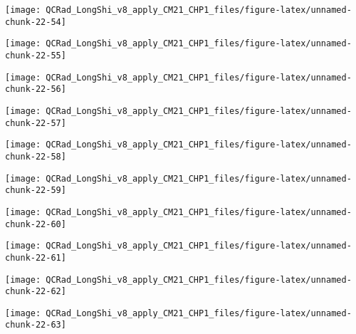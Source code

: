 \documentclass[
  10pt,
  a4paper,oneside]{article}
\begin{document}
\begin{center}\texttt{[image: QCRad\_LongShi\_v8\_apply\_CM21\_CHP1\_files/figure-latex/unnamed-chunk-22-54]} \end{center}

\begin{center}\texttt{[image: QCRad\_LongShi\_v8\_apply\_CM21\_CHP1\_files/figure-latex/unnamed-chunk-22-55]} \end{center}

\begin{center}\texttt{[image: QCRad\_LongShi\_v8\_apply\_CM21\_CHP1\_files/figure-latex/unnamed-chunk-22-56]} \end{center}

\begin{center}\texttt{[image: QCRad\_LongShi\_v8\_apply\_CM21\_CHP1\_files/figure-latex/unnamed-chunk-22-57]} \end{center}

\begin{center}\texttt{[image: QCRad\_LongShi\_v8\_apply\_CM21\_CHP1\_files/figure-latex/unnamed-chunk-22-58]} \end{center}

\begin{center}\texttt{[image: QCRad\_LongShi\_v8\_apply\_CM21\_CHP1\_files/figure-latex/unnamed-chunk-22-59]} \end{center}

\begin{center}\texttt{[image: QCRad\_LongShi\_v8\_apply\_CM21\_CHP1\_files/figure-latex/unnamed-chunk-22-60]} \end{center}

\begin{center}\texttt{[image: QCRad\_LongShi\_v8\_apply\_CM21\_CHP1\_files/figure-latex/unnamed-chunk-22-61]} \end{center}

\begin{center}\texttt{[image: QCRad\_LongShi\_v8\_apply\_CM21\_CHP1\_files/figure-latex/unnamed-chunk-22-62]} \end{center}

\begin{center}\texttt{[image: QCRad\_LongShi\_v8\_apply\_CM21\_CHP1\_files/figure-latex/unnamed-chunk-22-63]} \end{center}
\end{document}
